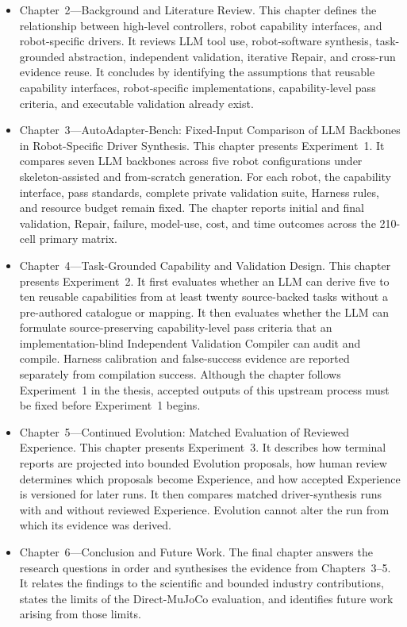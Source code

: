 \begin{itemize}[leftmargin=*,itemsep=0.7em]

  \item Chapter~2---Background and Literature Review. This chapter defines the
  relationship between high-level controllers, robot capability interfaces,
  and robot-specific drivers. It reviews LLM tool use, robot-software
  synthesis, task-grounded abstraction, independent validation, iterative
  Repair, and cross-run evidence reuse. It concludes by identifying the
  assumptions that reusable capability interfaces, robot-specific
  implementations, capability-level pass criteria, and executable validation
  already exist.

  \item Chapter~3---AutoAdapter-Bench: Fixed-Input Comparison of LLM Backbones
  in Robot-Specific Driver Synthesis. This chapter presents Experiment~1. It
  compares seven LLM backbones across five robot configurations under
  skeleton-assisted and from-scratch generation. For each robot, the capability
  interface, pass standards, complete private validation suite, Harness rules,
  and resource budget remain fixed. The chapter reports initial and final
  validation, Repair, failure, model-use, cost, and time outcomes across the
  210-cell primary matrix.

  \item Chapter~4---Task-Grounded Capability and Validation Design. This
  chapter presents Experiment~2. It first evaluates whether an LLM can derive
  five to ten reusable capabilities from at least twenty source-backed tasks
  without a pre-authored catalogue or mapping. It then evaluates whether the
  LLM can formulate source-preserving capability-level pass criteria that an
  implementation-blind Independent Validation Compiler can audit and compile.
  Harness calibration and false-success evidence are reported separately from
  compilation success. Although the chapter follows Experiment~1 in the thesis,
  accepted outputs of this upstream process must be fixed before
  Experiment~1 begins.

  \item Chapter~5---Continued Evolution: Matched Evaluation of Reviewed
  Experience. This chapter presents Experiment~3. It describes how terminal
  reports are projected into bounded Evolution proposals, how human review
  determines which proposals become Experience, and how accepted Experience is
  versioned for later runs. It then compares matched driver-synthesis runs with
  and without reviewed Experience. Evolution cannot alter the run from which
  its evidence was derived.

  \item Chapter~6---Conclusion and Future Work. The final chapter
  answers the research questions in order and synthesises the evidence from
  Chapters~3--5. It relates the findings to the scientific and bounded industry
  contributions, states the limits of the Direct-MuJoCo evaluation, and
  identifies future work arising from those limits.

\end{itemize}
